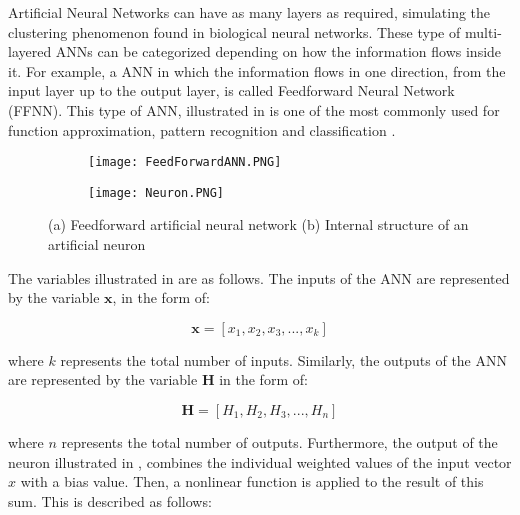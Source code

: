 Artificial Neural Networks can have as many layers as required, simulating the clustering phenomenon found in biological neural networks. These type of multi-layered ANNs can be categorized depending on how the information flows inside it. For example, a ANN in which the information flows in one direction, from the input layer up to the output layer, is called Feedforward Neural Network (FFNN). This type of ANN, illustrated in  is one of the most commonly used for function approximation, pattern recognition and classification \cite{zhang2003artificial}.

\begin{figure}[htb!]
	\centering
    \begin{subfigure}[b]{0.49\textwidth}
        \centering
        \texttt{[image: FeedForwardANN.PNG]}
        \caption{}
        \label{fig:FFANN}
    \end{subfigure}
    \begin{subfigure}[b]{0.49\textwidth}
        \centering
        \texttt{[image: Neuron.PNG]}
        \caption{}
        \label{fig:neuron}
    \end{subfigure}
    \caption{(a) Feedforward artificial neural network (b) Internal structure of an artificial neuron \cite{rodriguez2019application}}
    \label{fig:neruonANN}
\end{figure}

The variables illustrated in  are as follows. The inputs of the ANN are represented by the variable $\mathbf{x}$, in the form of:

\begin{equation}
    \mathbf{x} = [x_1, x_2, x_3, ... , x_k ]
    \label{c6_neuronin}
\end{equation}

\noindent where $k$ represents the total number of inputs. Similarly, the outputs of the ANN are represented by the variable $\mathbf{H}$ in the form of:

\begin{equation}
    \mathbf{H} = [H_1, H_2, H_3, ... , H_n ]
    \label{c6_networkout}
\end{equation}

\noindent where $n$ represents the total number of outputs. Furthermore, the output of the neuron illustrated in , combines the individual weighted values of the input vector $x$ with a bias value. Then, a nonlinear function is applied to the result of this sum. This is described as follows:

